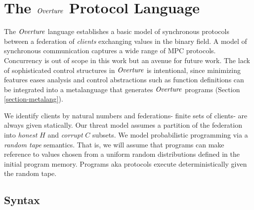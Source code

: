 \section{The $\mathit{Overture}$ Protocol Language}
\label{section-lang}

The $\mathit{Overture}$ language establishes a basic model of synchronous
protocols between a federation of \emph{clients} exchanging values in
the binary field. A model of synchronous communication captures a wide
range of MPC protocols. Concurrency is out of scope in this work but
an avenue for future work. The lack of sophisticated control
structures in $\mathit{Overture}$ is intentional, since minimizing features
eases analysis and control abstractions such as function definitions
can be integrated into a metalanguage that generates $\mathit{Overture}$
programs (Section \ref{section-metalang}).

We identify clients by natural numbers and federations- finite sets of
clients- are always given statically.  Our threat model assumes a
partition of the federation into \emph{honest} $H$ and \emph{corrupt}
$C$ subsets. We model probabilistic programming via a \emph{random
tape} semantics. That is, we will assume that programs can make
reference to values chosen from a uniform random distributions defined
in the initial program memory.  Programs aka protocols execute
deterministically given the random tape.

\subsection{Syntax}

\minifedfig

